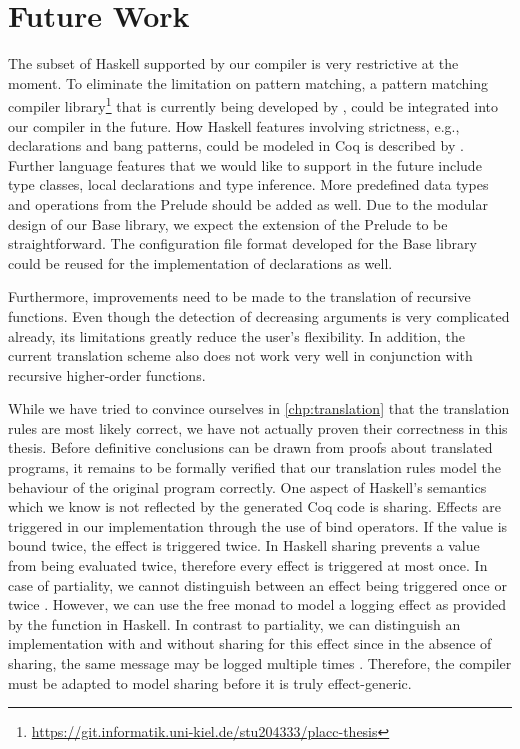 \section{Future Work} \label{sec:conclusion:future-work}

The subset of Haskell supported by our compiler is very restrictive at the moment.
To eliminate the limitation on pattern matching, a pattern matching compiler library\footnote{\url{https://git.informatik.uni-kiel.de/stu204333/placc-thesis}} that is currently being developed by , could be integrated into our compiler in the future.
How Haskell features involving strictness, e.g.,  declarations and bang patterns, could be modeled in Coq is described by \citet[pp.~132-134]{Christiansen:2019}.
Further language features that we would like to support in the future include type classes, local declarations and type inference.
More predefined data types and operations from the Prelude should be added as well.
Due to the modular design of our Base library, we expect the extension of the Prelude to be straightforward.
The configuration file format developed for the Base library could be reused for the implementation of  declarations as well.

Furthermore, improvements need to be made to the translation of recursive functions.
Even though the detection of decreasing arguments is very complicated already, its limitations greatly reduce the user's flexibility.
In addition, the current translation scheme also does not work very well in conjunction with recursive higher-order functions.

While we have tried to convince ourselves in \autoref{chp:translation} that the translation rules are most likely correct, we have not actually proven their correctness in this thesis.
Before definitive conclusions can be drawn from proofs about translated programs, it remains to be formally verified that our translation rules model the behaviour of the original program correctly.
One aspect of Haskell's semantics which we know is not reflected by the generated Coq code is sharing.
Effects are triggered in our implementation through the use of bind operators.
If the value is bound twice, the effect is triggered twice.
In Haskell sharing prevents a value from being evaluated twice, therefore every effect is triggered at most once.
In case of partiality, we cannot distinguish between an effect being triggered once or twice \cite[p.~131]{Christiansen:2019}.
However, we can use the free monad to model a logging effect as provided by the function  in Haskell.
In contrast to partiality, we can distinguish an implementation with and without sharing for this effect since in the absence of sharing, the same message may be logged multiple times \cite[p.~131]{Christiansen:2019}.
Therefore, the compiler must be adapted to model sharing before it is truly effect-generic.
